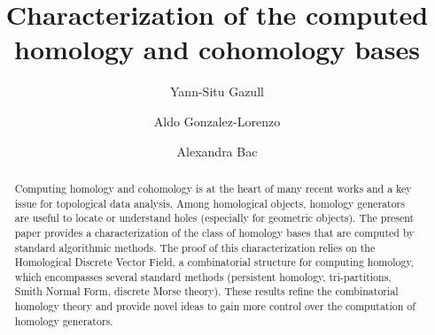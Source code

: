 \documentclass[runningheads]{llncs}
\newcommand{\add}[1]{{#1}}%
\begin{document}

\title{Characterization of the computed homology and cohomology bases}

\author{{Yann-Situ Gazull} %
\and {Aldo Gonzalez-Lorenzo} %
\and {Alexandra Bac} %
}


% 

\maketitle              %

\begin{abstract}
  Computing homology and cohomology is at the heart of many recent works and a key issue for topological data analysis.
Among homological objects, homology generators are useful to locate or understand holes (especially for geometric objects).
\add{The present paper provides a characterization of the class of homology bases that are computed by standard algorithmic methods.}
The proof of this characterization relies on the Homological Discrete Vector Field, a combinatorial structure for computing homology, which encompasses several standard methods (persistent homology, tri-partitions, Smith Normal Form, discrete Morse theory).
These results refine the combinatorial homology theory and provide novel ideas to gain more control over the computation of homology generators.
\end{abstract}
\end{document}
